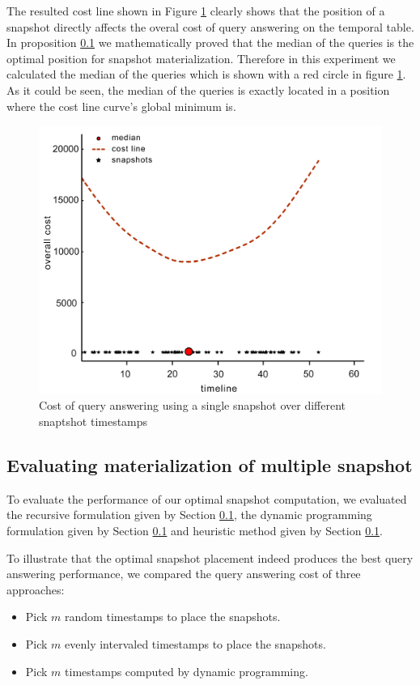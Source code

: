 The resulted cost line shown in Figure \ref{fig:single_snapshot} clearly shows that the position of a snapshot directly affects the overal cost of query answering on the temporal table. In proposition \ref{} we mathematically proved that the median of the queries is the optimal position for snapshot materialization. Therefore in this experiment we calculated the median of the queries which is shown with a red circle in figure \ref{fig:single_snapshot}. As it could be seen, the median of the queries is exactly located in a position where the cost line curve's global minimum is.
\begin{figure}
	\label{fig:single_snapshot}
	\centering
	\includegraphics[width=\textwidth]{figs/single_snapshot.jpg}
	\caption{Cost of query answering using a single snapshot over different snaptshot timestamps}
\end{figure} 

\subsection{Evaluating materialization of multiple snapshot}
To evaluate the performance of our optimal snapshot computation, we evaluated the recursive formulation given
by Section \ref{}, the dynamic programming formulation given by Section \ref{} and heuristic method given by Section \ref{}. 

To illustrate that the optimal snapshot placement indeed produces the best query answering performance, we compared the query answering cost of three approaches:
\begin{itemize}
	\item Pick $m$ random timestamps to place the snapshots.
	\item Pick $m$ evenly intervaled timestamps to place the snapshots.
	\item Pick $m$ timestamps computed by dynamic programming.
\end{itemize}

